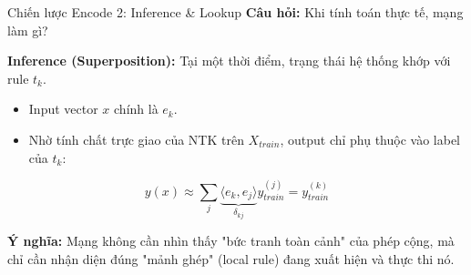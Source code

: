 \begin{frame}{Chiến lược Encode 2: Inference & Lookup}
  \textbf{Câu hỏi:} Khi tính toán thực tế, mạng làm gì?

  \textbf{Inference (Superposition):}
  Tại một thời điểm, trạng thái hệ thống khớp với rule $t_k$. 
  \begin{itemize}
    \item Input vector $x$ chính là $e_k$.
    \item Nhờ tính chất trực giao của NTK trên $X_{train}$, output chỉ phụ thuộc vào label của $t_k$:
  \end{itemize}
  \[
    y(x) \approx \sum_{j} \underbrace{\langle e_k, e_j \rangle}_{\delta_{kj}} y^{(j)}_{train} = y^{(k)}_{train}
  \]

  \vspace{0.2cm}
  \textbf{Ý nghĩa:} Mạng không cần nhìn thấy "bức tranh toàn cảnh" của phép cộng, mà chỉ cần nhận diện đúng "mảnh ghép" (local rule) đang xuất hiện và thực thi nó.
\end{frame}
